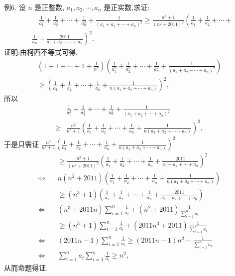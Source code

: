例6. 设 $n$ 是正整数, $a_1, a_2, \cdots, a_n$ 是正实数,求证:
$$
\begin{aligned}
& \quad \frac{1}{a_1^2}+\frac{1}{a_2^2}+\cdots+\frac{1}{a_n^2}+\frac{1}{\left(a_1+a_2+\cdots+a_n\right)^2} \geqslant \frac{n^3+1}{\left(n^2+2011\right)^2}\left(\frac{1}{a_1}+\frac{1}{a_2}+\cdots+\right. \\
& \left.\frac{1}{a_n}+\frac{2011}{a_1+a_2+\cdots+a_n}\right)^2 .
\end{aligned}
$$
证明:由柯西不等式可得,
$$
\begin{gathered}
\left(1+1+\cdots+1+\frac{1}{n^2}\right)\left(\frac{1}{a_1^2}+\frac{1}{a_2^2}+\cdots+\frac{1}{a_n^2}+\frac{1}{\left(a_1+a_2+\cdots+a_n\right)^2}\right) \\
\geqslant\left(\frac{1}{a_1}+\frac{1}{a_2}+\cdots+\frac{1}{a_n}+\frac{1}{n\left(a_1+a_2+\cdots+a_n\right)}\right)^2,
\end{gathered}
$$
所以
$$
\begin{aligned}
& \frac{1}{a_1^2}+\frac{1}{a_2^2}+\cdots+\frac{1}{a_n^2}+\frac{1}{\left(a_1+a_2+\cdots+a_n\right)^2} \\
\geqslant & \frac{n^2}{n^3+1}\left(\frac{1}{a_1}+\frac{1}{a_2}+\cdots+\frac{1}{a_n}+\frac{1}{n\left(a_1+a_2+\cdots+a_n\right)}\right)^2,
\end{aligned}
$$
于是只需证 $\frac{n^2}{n^3+1}\left(\frac{1}{a_1}+\frac{1}{a_2}+\cdots+\frac{1}{a_n}+\frac{1}{n\left(a_1+a_2+\cdots+a_n\right)}\right)^2$
$$
\begin{array}{ll} 
& \geqslant \frac{n^3+1}{\left(n^2+2011\right)^2}\left(\frac{1}{a_1}+\frac{1}{a_2}+\cdots+\frac{1}{a_n}+\frac{2011}{a_1+a_2+\cdots+a_n}\right)^2 \\
\Leftrightarrow \quad & n\left(n^2+2011\right)\left(\frac{1}{a_1}+\frac{1}{a_2}+\cdots+\frac{1}{a_n}+\frac{1}{n\left(a_1+a_2+\cdots+a_n\right)}\right) \\
& \geqslant\left(n^3+1\right)\left(\frac{1}{a_1}+\frac{1}{a_2}+\cdots+\frac{1}{a_n}+\frac{2011}{a_1+a_2+\cdots+a_n}\right) \\
\Leftrightarrow \quad & \left(n^3+2011 n\right) \sum_{i=1}^n \frac{1}{a_i}+\left(n^2+2011\right) \frac{1}{\sum_{i=1}^n a_i} \\
& \geqslant\left(n^3+1\right) \sum_{i=1}^n \frac{1}{a_i}+\left(2011 n^3+2011\right) \frac{1}{\sum_{i=1}^n a_i} \\
\Leftrightarrow \quad & (2011 n-1) \sum_{i=1}^n \frac{1}{a_i} \geqslant(2011 n-1) n^2-\frac{1}{\sum_{i=1}^n a_i} \\
\Leftrightarrow \quad & \sum_{i=1}^n a_i \sum_{i=1}^n \frac{1}{a_i} \geqslant n^2,
\end{array}
$$
从而命题得证.



